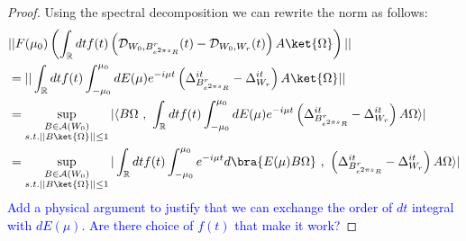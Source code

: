 \documentclass[a4paper,11pt]{article}
\theoremstyle{definition}
\newcommand{\lb}{\left(}
\newcommand{\rb}{\right)}
\newcommand{\NL}[1]{\textcolor{blue}{#1}}
\begin{document}
\begin{proof}
    Using the spectral decomposition we can rewrite the norm as follows:
    \begin{align}
        \begin{split}
            &||F(\mu_0)\lb\int_\mathbb{R} dt f(t)\lb \mathcal{D}_{W_0, B^r_{e^{2\pi s}R}}(t) - \mathcal{D}_{W_0, W_r}(t) \rb A\ket{\Omega}\rb||
            \\&= ||\int_\mathbb{R} dtf(t)\int_{-\mu_0}^{\mu_0}dE(\mu) e^{-i\mu t}\lb\Delta_{B^r_{e^{2\pi s}R}}^{it} - \Delta_{W_r}^{it}\rb A\ket{\Omega}||
            \\&
            =\sup_{\substack{B\in\mathcal{A}(W_0)\\s.t.||B\ket{\Omega}||\leq 1}}|\langle B\Omega\text{ , }\int_\mathbb{R}dt f(t)\int_{-\mu_0}^{\mu_0}dE(\mu)e^{-i\mu t}\lb\Delta_{B^r_{e^{2\pi s}R}}^{it} - \Delta_{W_r}^{it}\rb A\Omega\rangle|
            \\&
            =\sup_{\substack{B\in\mathcal{A}(W_0)\\ s.t.||B\ket{\Omega}||\leq 1}}|\int_\mathbb{R}dt f(t)\int_{-\mu_0}^{\mu_0}e^{-i\mu t}d\bra{E(\mu) B\Omega}\text{ , }\lb\Delta_{B^r_{e^{2\pi s}R}}^{it} - \Delta_{W_r}^{it}\rb A\Omega\rangle|
        \end{split}
    \end{align}
\NL{Add a physical argument to justify that we can exchange the order of $dt$ integral with $dE(\mu)$. Are there choice of $f(t)$ that make it work?}
    

\end{proof}
\end{document}
